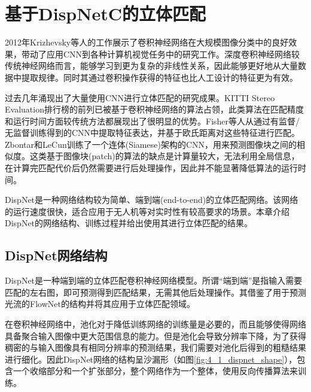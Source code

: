 
\chapter{基于DispNetC的立体匹配}
2012年Krizhevsky等人的工作\cite{krizhevsky2012imagenet}展示了卷积神经网络在大规模图像分类中的良好效果，带动了应用CNN到各种计算机视觉任务中的研究工作。深度卷积神经网络较传统神经网络而言，能够学习到更为复杂的非线性关系，因此能够更好地从大量数据中提取规律。同时其通过卷积操作获得的特征也比人工设计的特征更为有效。

过去几年涌现出了大量使用CNN进行立体匹配的研究成果。KITTI\cite{Menze_2015_CVPR} Stereo Evaluation排行榜的前列已被基于卷积神经网络的算法占领，此类算法在匹配精度和运行时间方面较传统方法都展现出了很明显的优势。Fisher等人\cite{fischer2014descriptor}从通过有监督/无监督训练得到的CNN中提取特征表达，并基于欧氏距离对这些特征进行匹配。Zbontar和LeCun\cite{zbontar2016stereo}训练了一个连体(Siamese)架构的CNN，用来预测图像块之间的相似度。这类基于图像块(patch)的算法的缺点是计算量较大，无法利用全局信息，在计算完匹配代价后仍然需要进行后处理操作，因此并不能显著降低算法的运行时间。

DispNet\cite{mayer2016large}是一种网络结构较为简单、端到端(end-to-end)的立体匹配网络。该网络的运行速度很快，适合应用于无人机等对实时性有较高要求的场景。本章介绍DispNet的网络结构、训练过程并给出使用其进行立体匹配的结果。

\section{DispNet网络结构}
DispNet是一种端到端的立体匹配卷积神经网络模型。所谓“端到端”是指输入需要匹配的左右图，即可预测得到匹配结果，无需其他后处理操作。其借鉴了用于预测光流的FlowNet\cite{dosovitskiy2015flownet}的结构并将其应用于立体匹配领域。

在卷积神经网络中，池化对于降低训练网络的训练量是必要的，而且能够使得网络具备聚合输入图像中更大范围信息的能力。但是池化会导致分辨率下降，为了获得稠密的与输入图像具有相同分辨率的预测结果，我们需要对池化后得到的粗糙结果进行细化。因此DispNet网络的结构呈沙漏形（如图\ref{fig:4_1_dispnet_shape}），包含一个收缩部分和一个扩张部分，整个网络作为一个整体，使用反向传播算法来训练。

